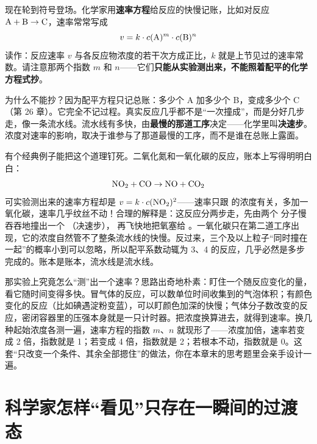 现在轮到符号登场。化学家用\textbf{速率方程}给反应的快慢记账，比如对反应 $\mathrm{A} + \mathrm{B} \rightarrow \mathrm{C}$，速率常常写成
\[v = k \cdot c(\mathrm{A})^{m} \cdot c(\mathrm{B})^{n}\]
读作：反应速率 $v$ 与各反应物浓度的若干次方成正比，$k$ 就是上节见过的速率常数。请注意那两个指数 $m$ 和 $n$——它们\textbf{只能从实验测出来，不能照着配平的化学方程式抄}。

为什么不能抄？因为配平方程只记总账：多少个 A 加多少个 B，变成多少个 C（第 26 章）。它完全不记过程。真实反应几乎都不是“一次撞成”，而是分好几步走，像一条流水线。流水线有多快，由\textbf{最慢的那道工序}决定——化学里叫\textbf{决速步}。浓度对速率的影响，取决于谁参与了那道最慢的工序，而不是谁在总账上露面。

有个经典例子能把这个道理钉死。二氧化氮和一氧化碳的反应，账本上写得明明白白：
\[\mathrm{NO_2} + \mathrm{CO} \rightarrow \mathrm{NO} + \mathrm{CO_2}\]
可实验测出来的速率方程却是 $v = k \cdot c(\mathrm{NO_2})^{2}$——速率只跟  的浓度有关，多加一氧化碳，速率几乎纹丝不动！合理的解释是：这反应分两步走，先由两个  分子慢吞吞地撞出一个 （决速步）， 再飞快地把氧塞给 。一氧化碳只在第二道工序出现，它的浓度自然管不了整条流水线的快慢。反过来，三个及以上粒子“同时撞在一起”的概率小到可以忽略，所以配平系数动辄为 3、4 的反应，几乎必然是多步完成的。账本是账本，流水线是流水线。

那实验上究竟怎么“测”出一个速率？思路出奇地朴素：盯住一个随反应变化的量，看它随时间变得多快。冒气体的反应，可以数单位时间收集到的气泡体积；有颜色变化的反应（比如碘遇淀粉变蓝），可以盯颜色加深的快慢；气体分子数改变的反应，密闭容器里的压强本身就是一只计时器。把浓度换算进去，就得到速率。换几种起始浓度各测一遍，速率方程的指数 $m$、$n$ 就现形了——浓度加倍，速率若变成 2 倍，指数就是 1；若变成 4 倍，指数就是 2；若根本不动，指数就是 0。这套“只改变一个条件、其余全部摁住”的做法，你在本章末的思考题里会亲手设计一遍。

\section{科学家怎样“看见”只存在一瞬间的过渡态}

